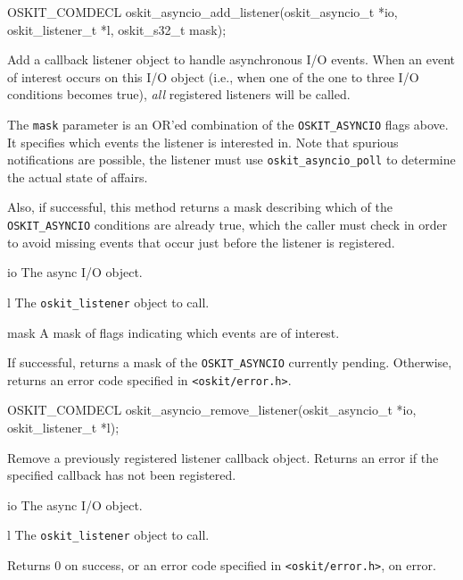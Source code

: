 \begin{apisyn}

	\funcproto OSKIT_COMDECL
	oskit_asyncio_add_listener(oskit_asyncio_t *io, oskit_listener_t *l,
				   oskit_s32_t mask);
\end{apisyn}
\begin{apidesc}
	Add a callback listener object to handle asynchronous I/O events.
	When an event of interest occurs on this I/O object
	(i.e., when one of the one to three I/O conditions becomes true),
	\emph{all} registered listeners will be called.

	The \texttt{mask} parameter is an OR'ed combination of the
	\texttt{OSKIT_ASYNCIO} flags above.
	It specifies which events the listener is interested in.
	Note that spurious notifications are possible, the listener
	must use \texttt{oskit_asyncio_poll} to determine the actual state
	of affairs.

	Also, if successful, this method returns a mask
	describing which of the \texttt{OSKIT_ASYNCIO} conditions are
	already true,
	which the caller must check in order to avoid missing events
	that occur just before the listener is registered.
\end{apidesc}
\begin{apiparm}
	\item[io]
		The async I/O object.
	\item[l]
		The \texttt{oskit_listener} object to call.
	\item[mask]
		A mask of flags indicating which events are of interest.
\end{apiparm}
\begin{apiret}
	If successful, returns a mask of the \texttt{OSKIT_ASYNCIO}
	currently pending.
	Otherwise, returns an error code specified in
	{\tt <oskit/error.h>}.
\end{apiret}

\begin{apisyn}

	\funcproto OSKIT_COMDECL
	oskit_asyncio_remove_listener(oskit_asyncio_t *io, oskit_listener_t *l);
\end{apisyn}
\begin{apidesc}
	Remove a previously registered listener callback object.
	Returns an error if the specified callback has not been registered.
\end{apidesc}
\begin{apiparm}
	\item[io]
		The async I/O object.
	\item[l]
		The \texttt{oskit_listener} object to call.
\end{apiparm}
\begin{apiret}
	Returns 0 on success, or an error code specified in
	{\tt <oskit/error.h>}, on error.
\end{apiret}

